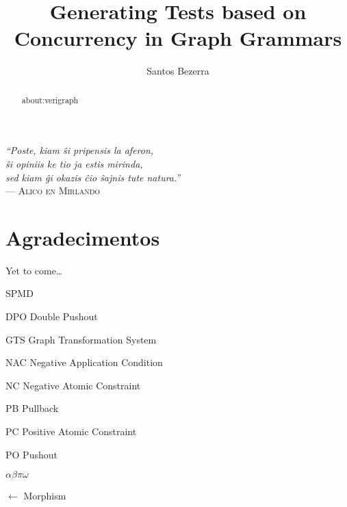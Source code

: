 \documentclass[ppgc,diss,english,openright]{iiufrgs}
\title{Generating Tests based on Concurrency in Graph Grammars}
\author{Santos Bezerra}{Jonas}
\theoremstyle{plain}
\theoremstyle{definition}
\begin{document}
  \maketitle
  \clearpage

  \clearpage
  \begin{flushright}
    \mbox{}\vfill
    {\sffamily\itshape
    ``Poste, kiam \^si pripensis la aferon,\\
    \^si opiniis ke tio ja estis mirinda,\\
    sed kiam \^gi okazis \^cio \^sajnis tute natura.''\\}
    --- \textsc{Alico en Mirlando}
  \end{flushright}

  \chapter*{Agradecimentos}
  Yet to come\ldots
  
  \begin{abstract}
    about:verigraph
  \end{abstract}

  \begin{listofabbrv}{SPMD}
          \item[DPO] Double Pushout
          \item[GTS] Graph Transformation System
          \item[NAC] Negative Application Condition
          \item[NC] Negative Atomic Constraint
          \item[PB] Pullback
          \item[PC] Positive Atomic Constraint
          \item[PO] Pushout
  \end{listofabbrv}

  \begin{listofsymbols}{$\alpha\beta\pi\omega$}
         \item[$\leftarrow$] Morphism
  \end{listofsymbols}

  \listoffigures
  \tableofcontents

  
  
  
  
  
  
  
  
  
\end{document}
